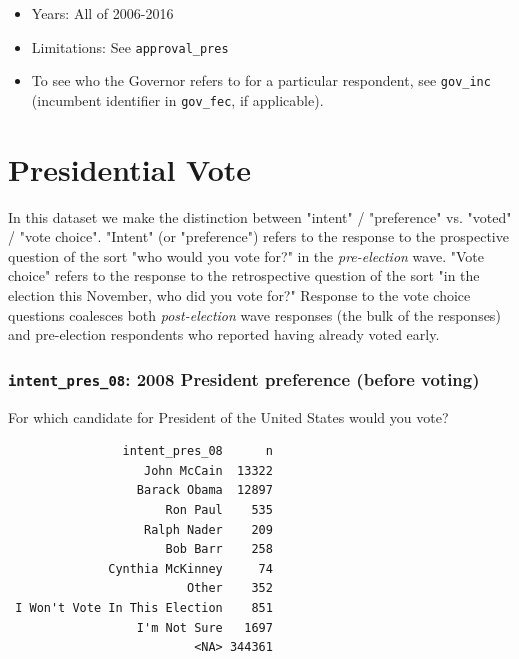 \documentclass[10pt,article,oneside]{memoir}
\theoremstyle{definition}
\begin{document}
\begin{itemize}
\tightlist
\item
  Years: All of 2006-2016
\item
  Limitations: See \texttt{approval\_pres}
\item
  To see who the Governor refers to for a particular respondent, see
  \texttt{gov\_inc} (incumbent identifier in \texttt{gov\_fec}, if
  applicable).
\end{itemize}

\newpage

\section{Presidential Vote}\label{presidential-vote}

\begin{tcolorbox}[title={A note on \texttt{intent} and \texttt{voted}}]
In this dataset we make the distinction between "intent" / "preference" vs. "voted" / "vote choice". "Intent" (or "preference") refers to the response to the prospective question of the sort "who would you vote for?" in the \emph{pre-election} wave. "Vote choice" refers to the response to the retrospective question of the sort "in the election this November, who did you vote for?" Response to the vote choice questions coalesces both \emph{post-election} wave responses (the bulk of the responses) and pre-election respondents who reported having already voted early. 
\end{tcolorbox}

\subsubsection{\texorpdfstring{\texttt{intent\_pres\_08}: 2008 President
preference (before
voting)}{intent\_pres\_08: 2008 President preference (before voting)}}\label{intent_pres_08-2008-president-preference-before-voting}

For which candidate for President of the United States would you vote?

\begin{verbatim}
                intent_pres_08      n
                   John McCain  13322
                  Barack Obama  12897
                      Ron Paul    535
                   Ralph Nader    209
                      Bob Barr    258
              Cynthia McKinney     74
                         Other    352
 I Won't Vote In This Election    851
                  I'm Not Sure   1697
                          <NA> 344361
\end{verbatim}
\end{document}
